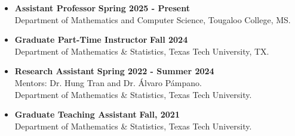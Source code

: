 \documentclass[12pt]{book}
\begin{document}
\begin{itemize}

\item \textbf{Assistant Professor} \hfill \textbf{Spring 2025 - Present}\\
Department of Mathematics and Computer Science, Tougaloo College, MS.

	\item \textbf{Graduate Part-Time Instructor} \hfill \textbf{Fall 2024}\\
Department of Mathematics \& Statistics, Texas Tech University, TX.



\item \textbf{Research Assistant} \hfill \textbf{Spring 2022 - Summer 2024} \\
Mentors: Dr. Hung Tran and Dr. \'Alvaro P\'ampano.\\
Department of Mathematics \& Statistics, Texas Tech University.

\item \textbf{Graduate Teaching Assistant} \hfill \textbf{Fall, 2021}\\
Department of Mathematics \& Statistics, Texas Tech University.






\end{itemize}
\end{document}
